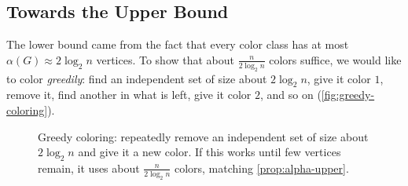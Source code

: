 \subsection{Towards the Upper Bound}\label{sec:chi-upper-plan}

The lower bound came from the fact that every color class has at most \(\alpha(G) \approx 2 \log_{2} n\) vertices. To show that about \(\frac{n}{2 \log_{2} n}\) colors suffice, we would like to color \emph{greedily}: find an independent set of size about \(2 \log_{2} n\), give it color \(1\), remove it, find another in what is left, give it color \(2\), and so on (\autoref{fig:greedy-coloring}).

\begin{figure}[H]
    \centering
    \caption{Greedy coloring: repeatedly remove an independent set of size about \(2 \log_{2} n\) and give it a new color. If this works until few vertices remain, it uses about \(\frac{n}{2 \log_{2} n}\) colors, matching \autoref{prop:alpha-upper}.}
    \label{fig:greedy-coloring}
\end{figure}

